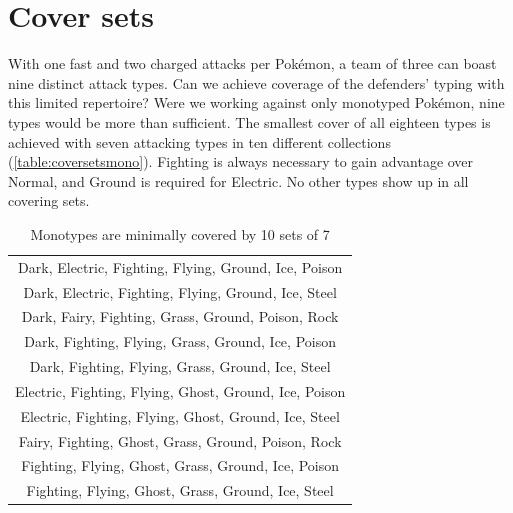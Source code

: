 \section{Cover sets\label{sec:coversets}}
With one fast and two charged attacks per Pokémon, a team of three can boast nine distinct attack types.
Can we achieve coverage of the defenders' typing with this limited repertoire?
Were we working against only monotyped Pokémon, nine types would be more than sufficient.
The smallest cover of all eighteen types is achieved with seven attacking types in
  ten different collections (\autoref{table:coversetsmono}).
Fighting is always necessary to gain advantage over Normal, and Ground is required for Electric.
No other types show up in all covering sets.

\begin{table}[hb]
\centering
\begin{tabular}{c}
Dark, Electric, Fighting, Flying, Ground, Ice, Poison\\
Dark, Electric, Fighting, Flying, Ground, Ice, Steel\\
Dark, Fairy, Fighting, Grass, Ground, Poison, Rock\\
Dark, Fighting, Flying, Grass, Ground, Ice, Poison\\
Dark, Fighting, Flying, Grass, Ground, Ice, Steel\\
Electric, Fighting, Flying, Ghost, Ground, Ice, Poison\\
Electric, Fighting, Flying, Ghost, Ground, Ice, Steel\\
Fairy, Fighting, Ghost, Grass, Ground, Poison, Rock\\
Fighting, Flying, Ghost, Grass, Ground, Ice, Poison\\
Fighting, Flying, Ghost, Grass, Ground, Ice, Steel\\
\end{tabular}
\caption{Monotypes are minimally covered by 10 sets of 7\label{table:coversetsmono}}
\end{table}

